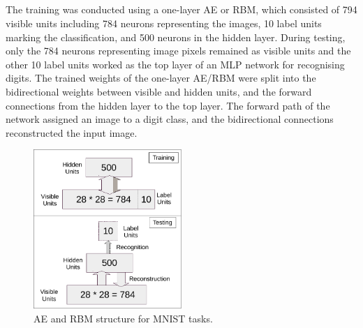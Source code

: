 \subsection{}
\label{subsec:MNIST_setup}
\DIFaddend The training was conducted using a one-layer AE or RBM, \DIFaddbegin {}\DIFaddend which consisted of 794 visible units including 784 neurons representing the images, 10 label units marking the classification, and 500 neurons \DIFdelbegin {}\DIFdelend in the hidden layer.
During testing, only the 784 neurons representing image pixels remained as visible units and the other 10 label units worked as the top layer of an MLP network for recognising digits.
The trained weights of the one-layer AE/RBM were split into the bidirectional weights between visible and hidden units, and the forward connections from the hidden layer to the top layer.
The forward path of the network assigned an image to a digit class, and the bidirectional connections reconstructed the input image.

\begin{figure}
	\centering
	\includegraphics[width=0.5\textwidth]{pics_sdlm/mnist.pdf}
	\caption{AE and RBM structure for MNIST tasks.}
	\label{fig:MNSIT}
\end{figure}

